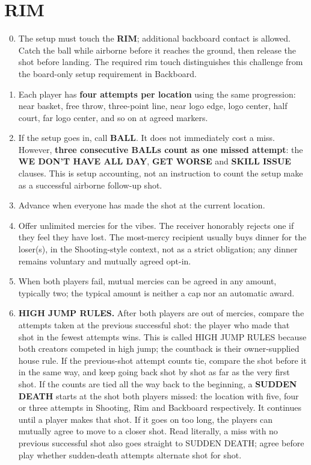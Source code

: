 \documentclass[11pt]{article}
\begin{document}
\section{RIM}
\begin{enumerate}[start=0]
\setcounter{enumi}{-1}
\item The setup must touch the \textbf{RIM}; additional backboard contact is
allowed. Catch the ball while airborne before it reaches the ground, then release
the shot before landing. The required rim touch distinguishes this challenge
from the board-only setup requirement in Backboard.
\item Each player has \textbf{four attempts per location} using the same
progression: near basket, free throw, three-point line, near logo edge, logo
center, half court, far logo center, and so on at agreed markers.
\item If the setup goes in, call \textbf{BALL}. It does not immediately cost a
miss. However, \textbf{three consecutive BALLs count as one missed attempt}:
the \textbf{WE DON'T HAVE ALL DAY}, \textbf{GET WORSE} and \textbf{SKILL ISSUE}
clauses. This is setup accounting, not an instruction to count the setup make
as a successful airborne follow-up shot.
\item Advance when everyone has made the shot at the current location.
\item Offer unlimited mercies for the vibes. The receiver honorably rejects
one if they feel they have lost. The most-mercy recipient usually buys dinner
for the loser(s), in the Shooting-style context, not as a strict obligation;
any dinner remains voluntary and mutually agreed opt-in.
\item When both players fail, mutual mercies can be agreed in any amount,
typically two; the typical amount is neither a cap nor an automatic award.
\item \textbf{HIGH JUMP RULES.} After both players are out of mercies, compare
the attempts taken at the previous successful shot: the player who made that
shot in the fewest attempts wins. This is called HIGH JUMP RULES because both
creators competed in high jump; the countback is their owner-supplied house rule.
If the previous-shot attempt counts tie, compare the shot before it in the same
way, and keep going back shot by shot as far as the very first shot. If the
counts are tied all the way back to the beginning, a \textbf{SUDDEN DEATH} starts
at the shot both players missed: the location with five, four or three attempts
in Shooting, Rim and Backboard respectively. It continues until a player makes
that shot. If it goes on too long, the players can mutually agree to move to a
closer shot. Read literally, a miss with no previous successful shot also goes
straight to SUDDEN DEATH; agree before play whether sudden-death attempts
alternate shot for shot.
\end{enumerate}
\end{document}
